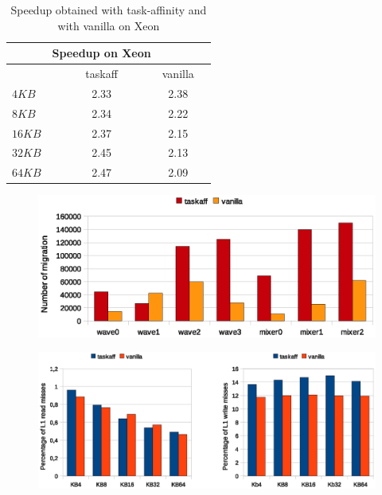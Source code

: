 \begin{table}[htbp]
\begin{center}
\begin{tabular}{l|c|c|c}
	\hline
	& Speedup on Xeon \\ \hline
	& taskaff & vanilla \\ \hline
	$4KB$ & 2.33 & 2.38 \\ \hline
	$8KB$ & 2.34 & 2.22  \\ \hline
	$16KB$ & 2.37 & 2.15 \\ \hline
	$32KB$  & 2.45 & 2.13 \\ \hline
	$64KB$  & 2.47 & 2.09 \\ \hline
\end{tabular}
\label{tab:speedup_xeon_i7}
\caption{Speedup obtained with task-affinity and with vanilla on Xeon}
\end{center}
\end{table}

\begin{figure}[htbp]
\centering
\includegraphics[width=\widefigure]{images/results_xeon/migration_xeon.eps}
\caption{}
\label{fig:migration_xeon}
\end{figure}

\begin{figure}[htbp]
\centering
\includegraphics[width=\widefigure]{images/results_xeon/l1_load_store_xeon.eps}
\caption{}
\label{fig:l1_load_store_xeon}
\end{figure}

